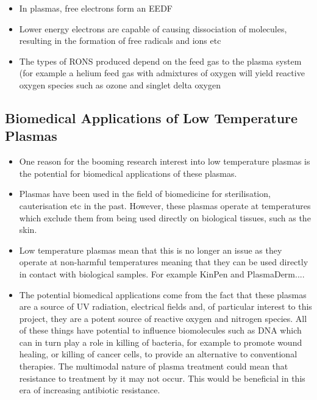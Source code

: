 \documentclass[11pt, oneside]{article}   	%
\begin{document}
\begin{itemize}
\item In plasmas, free electrons form an EEDF
\item Lower energy electrons are capable of causing dissociation of molecules, resulting in the formation of free radicals and ions etc
\item The types of RONS produced depend on the feed gas to the plasma system (for example a helium feed gas with admixtures of oxygen will yield reactive oxygen species such as ozone and singlet delta oxygen \cite{Niemi2013}
\end{itemize}


\subsection{Biomedical Applications of Low Temperature Plasmas}

\begin{itemize}

\item One reason for the booming research interest into low temperature plasmas is the potential for biomedical applications of these plasmas.
\item Plasmas have been used in the field of biomedicine for sterilisation, cauterisation etc in the past. However, these plasmas operate at temperatures which exclude them from being used directly on biological tissues, such as the skin.
\item Low temperature plasmas mean that this is no longer an issue as they operate at non-harmful temperatures meaning that they can be used directly in contact with biological samples. 
For example KinPen and PlasmaDerm....

\item The potential biomedical applications come from the fact that these plasmas are a source of UV radiation, electrical fields and, of particular interest to this project, they are a potent source of reactive oxygen and nitrogen species. All of these things have potential to influence biomolecules such as DNA which can in turn play a role in killing of bacteria, for example to promote wound healing, or killing of cancer cells, to provide an alternative to conventional therapies. 
The multimodal nature of plasma treatment could mean that resistance to treatment by it may not occur. 
This would be beneficial in this era of increasing antibiotic resistance.

\end{itemize}
\end{document}
